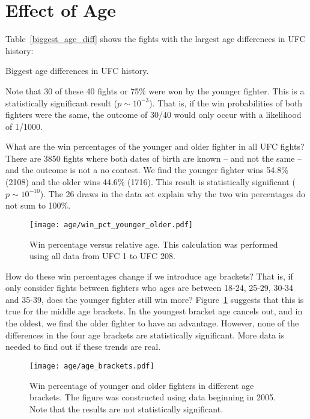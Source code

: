 \clearpage
\section{Effect of Age}
Table~\ref{biggest_age_diff} shows the fights
with the largest age differences in UFC history:

\begin{center}
\begin{table}[h!]

\caption{Biggest age differences in UFC history.}
\label{biggest_age_diff}
\end{table}
\end{center}

\clearpage

Note that 30 of these 40 fights or 75\% were won by the younger
fighter. This is a statistically
significant result ($p\sim 10^{-3}$). That is, if the win
probabilities of both fighters were the same, the outcome
of 30/40 would only occur with a likelihood of 1/1000.

What are the win percentages
of the younger and older fighter in all UFC fights?
There
are 3850 fights where both dates of birth are known
-- and not the same -- 
and the outcome is not a no contest.
We find
the younger fighter wins 54.8\% (2108) and the older
wins 44.6\% (1716). This result
is statistically significant ($p\sim 10^{-10}$).
The 26 draws in the data set explain why the two
win percentages do not sum to 100\%.

\begin{figure}[h]
\begin{center}
\texttt{[image: age/win\_pct\_younger\_older.pdf]}
\caption{Win percentage versus relative age. This calculation
was performed using all data from UFC 1 to UFC 208.}
\label{win_pct_younger_older}
\end{center}
\end{figure}

How do these win percentages change if we introduce
age brackets? That is, if only consider fights
between fighters who ages are between 18-24, 25-29,
30-34 and 35-39, does the younger fighter still win more?
Figure~\ref{win_pct_younger_older} suggests
that this is true for the middle age brackets. In the youngest
bracket age cancels out, and in the oldest, we find the
older fighter to have an advantage. However, none
of the differences in the four age brackets are statistically
significant. More data is needed to find out if these trends
are real.

\begin{figure}[h]
\begin{center}
\texttt{[image: age/age\_brackets.pdf]}
\caption{Win percentage of younger and older fighters
in different age brackets. The figure was constructed
using data beginning in 2005. Note that the results
are not statistically significant.}
\label{age_brackets}
\end{center}
\end{figure}

